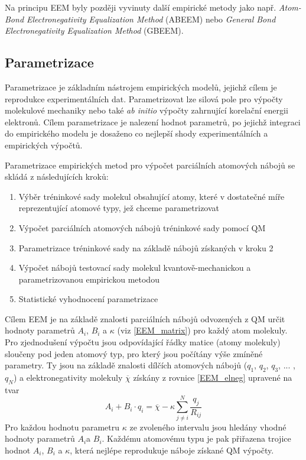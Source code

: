 Na principu EEM byly později vyvinuty další empirické metody jako např. \textit{Atom-Bond Electronegativity Equalization Method} (ABEEM) nebo \textit{General Bond Electronegativity Equalization Method} (GBEEM).

\subsection{Parametrizace}
\label{param}
Parametrizace je základním nástrojem empirických modelů, jejichž cílem je reproduk\-ce experimentálních dat. Parametrizovat lze silová pole pro výpočty molekulové mechaniky nebo také \textit{ab initio} výpočty zahrnující korelační energii elektronů. Cílem parametrizace je nalezení hodnot parametrů, po jejichž integraci do empirického modelu je dosaženo co nejlepší shody experimentálních a empirických výpočtů. 

Parametrizace empirických metod pro výpočet parciálních atomových nábojů se skládá z následujících kroků:

\begin{enumerate}
\itemsep0em
    \item Výběr tréninkové sady molekul obsahující atomy, které v dostatečné míře reprezentující atomové typy, jež chceme parametrizovat
    \item Výpočet parciálních atomových nábojů tréninkové sady pomocí QM
    \item Parametrizace tréninkové sady na základě nábojů získaných v kroku 2
    \item Výpočet nábojů testovací sady molekul kvantově-mechanickou a parametrizovanou empirickou metodou
    \item Statistické vyhodnocení parametrizace
\end{enumerate}

Cílem EEM je na základě znalosti parciálních nábojů odvozených z QM určit hodnoty parametrů $A_i$, $B_i$ a $\kappa$ (viz \ref{EEM_matrix}) pro každý atom molekuly. Pro zjednodušení výpočtu jsou odpovídající řádky matice (atomy molekuly) sloučeny pod jeden atomový typ, pro který jsou počítány výše zmíněné parametry. Ty jsou na základě znalosti dílčích atomových nábojů ($q_1$, $q_2$, $q_3$, ... , $q_N$) a elektronegativity molekuly $\overline{\chi}$ získány z rovnice \ref{EEM_elneg} upravené na tvar 
\begin{equation}
   A_i + B_i\cdot q_i = \overline{\chi} - \kappa \sum_{j \neq i}^{N} \frac{q_j}{R_{ij}}
\end{equation}
Pro každou hodnotu parametru $\kappa$ ze zvoleného intervalu jsou hledány vhodné hodnoty parametrů $A_i$a $B_i$. Každému atomovému typu je pak přiřazena trojice hodnot $A_i$, $B_i$ a $\kappa$, která nejlépe reprodukuje náboje získané QM výpočty.

